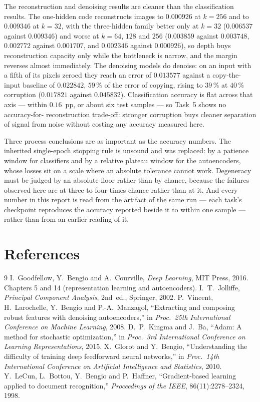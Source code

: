 \documentclass[11pt,a4paper]{article}
\begin{document}
The reconstruction and denoising results are cleaner than the classification results.  The
one-hidden code reconstructs images to $0.000926$ at $k=256$ and to $0.009346$ at $k=32$,
with the three-hidden family better only at $k=32$ ($0.006537$ against $0.009346$) and worse at
$k=64$, $128$ and $256$ ($0.003859$ against $0.003748$, $0.002772$ against $0.001707$, and $0.002346$
against $0.000926$), so depth buys reconstruction capacity only while the bottleneck is narrow,
and the margin reverses almost immediately.  The denoising models do
denoise: on an input with a fifth of its pixels zeroed they reach an error of $0.013577$ against a
copy-the-input baseline of $0.022842$, $59\,\%$ of the error of copying, rising to $39\,\%$ at
$40\,\%$ corruption ($0.017821$ against $0.045832$).  Classification accuracy is flat across
that axis --- within $0.16$~pp, or about six test samples --- so Task~5 shows no accuracy-for-
reconstruction trade-off: stronger corruption buys cleaner separation of signal from noise without
costing any accuracy measured here.

Three process conclusions are as important as the accuracy numbers.  The inherited single-epoch
stopping rule is unsound and was replaced: by a patience window for classifiers and by a relative
plateau window for the autoencoders, whose losses sit on a scale where an absolute tolerance
cannot work.  Degeneracy must be judged by an absolute floor rather than by chance, because the
failures observed here are at three to four times chance rather than at it.  And every number in
this report is read from the artifact of the same run --- each task's checkpoint reproduces the
accuracy reported beside it to within one sample --- rather than from an earlier reading of it.

\section{References}\label{sec:refs}
\begin{thebibliography}{9}
 I.~Goodfellow, Y.~Bengio and A.~Courville, \emph{Deep Learning}, MIT Press,
  2016.  Chapters 5 and 14 (representation learning and autoencoders).
 I.~T.~Jolliffe, \emph{Principal Component Analysis}, 2nd~ed., Springer, 2002.
 P.~Vincent, H.~Larochelle, Y.~Bengio and P.-A.~Manzagol, ``Extracting and
  composing robust features with denoising autoencoders,'' in \emph{Proc.\ 25th International
  Conference on Machine Learning}, 2008.
 D.~P.~Kingma and J.~Ba, ``Adam: A method for stochastic optimization,'' in
  \emph{Proc.\ 3rd International Conference on Learning Representations}, 2015.
 X.~Glorot and Y.~Bengio, ``Understanding the difficulty of training deep
  feedforward neural networks,'' in \emph{Proc.\ 14th International Conference on Artificial
  Intelligence and Statistics}, 2010.
 Y.~LeCun, L.~Bottou, Y.~Bengio and P.~Haffner, ``Gradient-based learning applied
  to document recognition,'' \emph{Proceedings of the IEEE}, 86(11):2278--2324, 1998.

\end{thebibliography}
\end{document}
